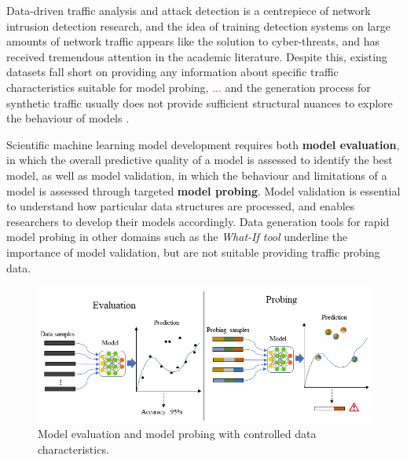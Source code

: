 \documentclass[runningheads]{llncs}
\begin{document}
Data-driven traffic analysis and attack detection is a centrepiece of network intrusion detection research, and the idea of training detection systems on large amounts of network traffic %
appears like the solution to cyber-threats, and has received tremendous attention in the academic literature. Despite this, existing datasets fall short on providing any information about specific traffic characteristics suitable for model probing, \textcolor{red}{...} and the generation process for synthetic traffic usually does not provide sufficient structural nuances to explore the behaviour of models \cite{sharafaldin2018toward}.%

Scientific machine learning model development requires both \textbf{model evaluation}, in which the overall predictive quality of a model is assessed to identify the best model, as well as model validation, in which the behaviour and limitations of a model is assessed through targeted \textbf{model probing}. Model validation is essential to understand how particular data structures are processed, and enables researchers to develop their models accordingly. Data generation tools for rapid model probing in other domains such as the \textit{What-If tool} \cite{wexler2019if} underline the importance of model validation, but are not suitable providing traffic probing data.

\begin{figure}
\centering
\includegraphics[width=\textwidth]{images/Eva_Prob.png}
\caption{Model evaluation and model probing with controlled data characteristics.}
\end{figure}
\end{document}
